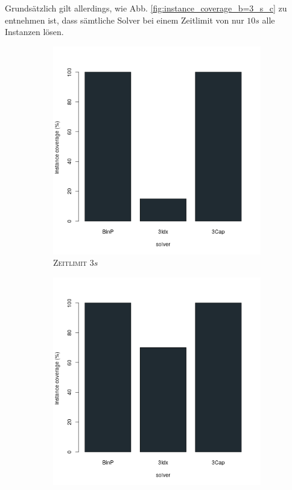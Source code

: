 Grundsätzlich gilt allerdings, wie Abb. \ref{fig:instance_coverage_b=3_s_c} zu entnehmen ist, dass sämtliche Solver
bei einem Zeitlimit von nur $10s$ alle Instanzen lösen.

\begin{figure}[H]
\centering

\begin{subfigure}[b]{0.3\textwidth}
\centering
\includegraphics[width=1.2\textwidth]{img/solver_instance_coverage_b=3_s_3s.png}
\caption{\textsc{Zeitlimit} $3s$}
\label{fig:instance_coverage_b=3_s_a}
\end{subfigure}
\hfill
\begin{subfigure}[b]{0.3\textwidth}
\centering
\includegraphics[width=1.2\textwidth]{img/solver_instance_coverage_b=3_s_5s.png}

\end{subfigure}
\end{figure}
